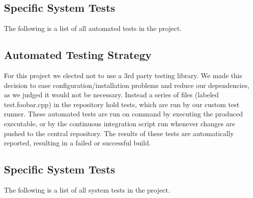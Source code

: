 \documentclass[12pt, titlepage]{article}
\begin{document}
\subsection{Specific System Tests}
The following is a list of all automated tests in the project.

	\subsection{Automated Testing Strategy}
	For this project we elected not to use a 3rd party testing library. We made this decision to ease configuration/installation problems and reduce our dependencies, as we judged it would not be necessary. Instead a series of files (labeled test.foobar.cpp) in the repository hold tests, which are run by our custom test runner. These automated tests are run on command by executing the produced executable, or by the continuous integration script run whenever changes are pushed to the central repository. The results of these tests are automatically reported, resulting in a failed or successful build.

	\subsection{Specific System Tests}
	The following is a list of all system tests in the project.
\end{document}
